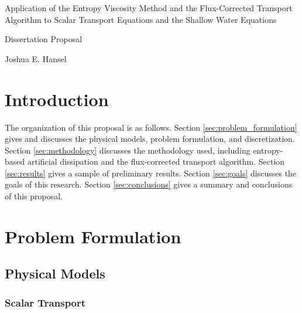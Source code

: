 \documentclass[12pt]{article}
\newcommand{\contentdir}{../dissertation/content}
\begin{document}
\begin{center}
  {\large
    Application of the Entropy Viscosity Method and the Flux-Corrected Transport
    Algorithm to Scalar Transport Equations and the Shallow Water Equations
  }

  {\scriptsize
    Dissertation Proposal
  }

  \vspace{1em}

  Joshua E. Hansel
\end{center}

\section{Introduction}


The organization of this proposal is as follows.
Section \ref{sec:problem_formulation} gives and discusses the physical models,
problem formulation, and discretization.
Section \ref{sec:methodology} discusses the methodology used, including
entropy-based artificial dissipation and the flux-corrected transport
algorithm.
Section \ref{sec:results} gives a sample of preliminary results.
Section \ref{sec:goals} discusses the goals of this research.
Section \ref{sec:conclusions} gives a summary and conclusions of this proposal.
\section{Problem Formulation\label{sec:problem_formulation}}
\subsection{Physical Models}
\subsubsection{Scalar Transport}
\end{document}
